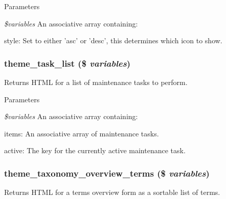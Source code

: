 \begin{DoxyParams}{Parameters}
\item[{\em \$variables}]An associative array containing:
\begin{DoxyItemize}
\item style: Set to either 'asc' or 'desc', this determines which icon to show. 
\end{DoxyItemize}\end{DoxyParams}
\hypertarget{group__themeable_gacac34ad88b724d01c7ca68f7891f64db}{
\subsubsection[{theme\_\-task\_\-list}]{\setlength{\rightskip}{0pt plus 5cm}theme\_\-task\_\-list (\$ {\em variables})}}
\label{group__themeable_gacac34ad88b724d01c7ca68f7891f64db}
Returns HTML for a list of maintenance tasks to perform.


\begin{DoxyParams}{Parameters}
\item[{\em \$variables}]An associative array containing:
\begin{DoxyItemize}
\item items: An associative array of maintenance tasks.
\item active: The key for the currently active maintenance task. 
\end{DoxyItemize}\end{DoxyParams}
\hypertarget{group__themeable_gabcead84347c45b0e1316953ab53bf3ad}{
\subsubsection[{theme\_\-taxonomy\_\-overview\_\-terms}]{\setlength{\rightskip}{0pt plus 5cm}theme\_\-taxonomy\_\-overview\_\-terms (\$ {\em variables})}}
\label{group__themeable_gabcead84347c45b0e1316953ab53bf3ad}
Returns HTML for a terms overview form as a sortable list of terms.



